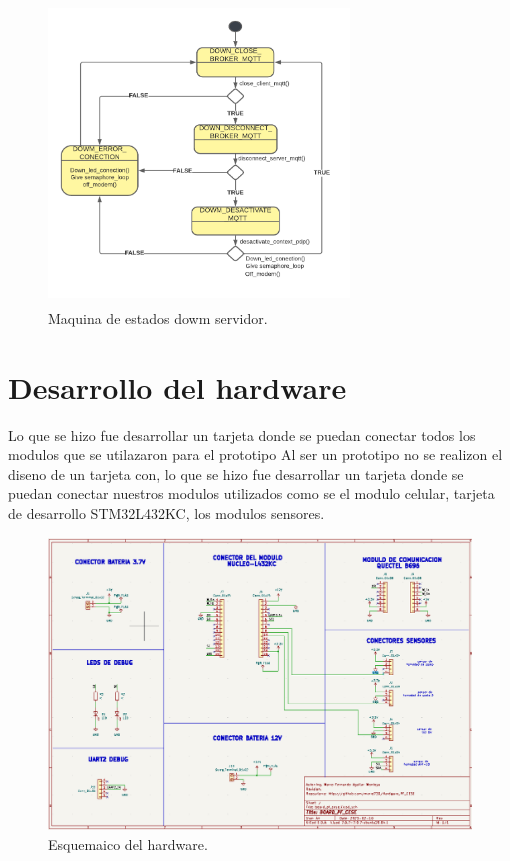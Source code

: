 \begin{figure}[htbp]
  \centering
	\includegraphics[width=8cm, height=8cm]{./Figures/SM down server.png}
	\caption{Maquina de estados dowm servidor.}
	\label{fig:Maquina de estados dowm servidor}
\end{figure}

\section{Desarrollo del hardware}

Lo que se hizo fue desarrollar un tarjeta donde se puedan conectar todos los modulos que se utilazaron para el prototipo
Al ser un prototipo no se realizon el diseno de un tarjeta con, lo que se hizo fue desarrollar un tarjeta donde se puedan conectar nuestros modulos utilizados como se el modulo celular, tarjeta de desarrollo STM32L432KC, los modulos sensores.

\begin{figure}[htbp]
  \centering
	\includegraphics[width=20cm, height=\textwidth, angle=90]{./Figures/esquematico.png}
	\caption{Esquemaico del hardware.}
	\label{fig:esquematico}
\end{figure}

